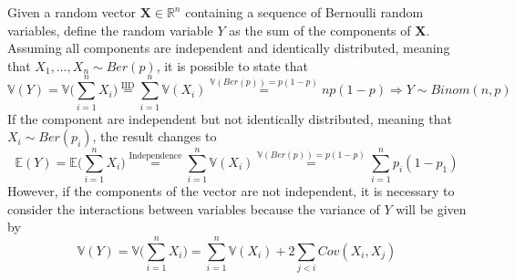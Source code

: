 \documentclass{report}
\begin{document}
\begin{examplebox}
    Given a random vector $\displaystyle \mathbf{X} \in \mathbb{R}^n$ containing a sequence of Bernoulli random variables, define the random variable $\displaystyle Y$ as the sum of the components of $\displaystyle \mathbf{X}$. \newline
    Assuming all components are independent and identically distributed, meaning that $\displaystyle X_1, \dots, X_n \sim Ber(p)$, it is possible to state that
    \[\mathbb{V}(Y) = \mathbb{V}\Bigg(\sum_{i = 1}^n X_i\Bigg) \stackrel{\text{IID}}{=} \sum_{i = 1}^n \mathbb{V}(X_i) \stackrel{\mathbb{V}(Ber(p)) = p(1 - p)}{=} np(1 - p) \Rightarrow Y \sim Binom(n, p)\]
    If the component are independent but not identically distributed, meaning that $\displaystyle X_i \sim Ber(p_i)$, the result changes to
    \[\mathbb{E}(Y) = \mathbb{E}\Bigg(\sum_{i = 1}^n X_i\Bigg) \stackrel{\text{Independence}}{=} \sum_{i = 1}^n \mathbb{V}(X_i) \stackrel{\mathbb{V}(Ber(p)) = p(1 - p)}{=} \sum_{i = 1}^n p_i(1 - p_1)\]
    However, if the components of the vector are not independent, it is necessary to consider the interactions between variables because the variance of $\displaystyle Y$ will be given by
    \[\mathbb{V}(Y) = \mathbb{V}\Bigg(\sum_{i = 1}^n X_i\Bigg) = \sum_{i = 1}^n \mathbb{V}(X_i) + 2\sum_{j < i} Cov(X_i, X_j)\]
\end{examplebox}
\end{document}
